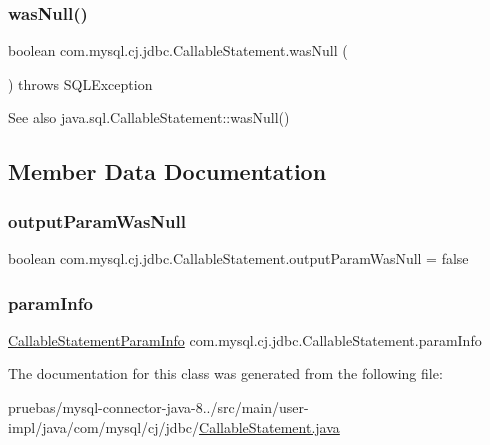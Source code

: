 \subsubsection{\texorpdfstring{was\+Null()}{wasNull()}}
{\footnotesize\ttfamily boolean com.\+mysql.\+cj.\+jdbc.\+Callable\+Statement.\+was\+Null (\begin{DoxyParamCaption}{ }\end{DoxyParamCaption}) throws S\+Q\+L\+Exception}

\begin{DoxySeeAlso}{See also}
java.\+sql.\+Callable\+Statement\+::was\+Null() 
\end{DoxySeeAlso}


\subsection{Member Data Documentation}
\mbox{\label{classcom_1_1mysql_1_1cj_1_1jdbc_1_1_callable_statement_a50b0a5e60e29ab7d67b07a27004293c4}} 
\subsubsection{\texorpdfstring{output\+Param\+Was\+Null}{outputParamWasNull}}
{\footnotesize\ttfamily boolean com.\+mysql.\+cj.\+jdbc.\+Callable\+Statement.\+output\+Param\+Was\+Null = false\hspace{0.3cm}{\ttfamily [protected]}}

\mbox{\label{classcom_1_1mysql_1_1cj_1_1jdbc_1_1_callable_statement_a9b918f6fd2f0ff28fc6b3c8560d9a59b}} 
\subsubsection{\texorpdfstring{param\+Info}{paramInfo}}
{\footnotesize\ttfamily \mbox{\hyperlink{classcom_1_1mysql_1_1cj_1_1jdbc_1_1_callable_statement_1_1_callable_statement_param_info}{Callable\+Statement\+Param\+Info}} com.\+mysql.\+cj.\+jdbc.\+Callable\+Statement.\+param\+Info\hspace{0.3cm}{\ttfamily [protected]}}



The documentation for this class was generated from the following file\+:\begin{DoxyCompactItemize}
\item 
pruebas/mysql-\/connector-\/java-\/8../src/main/user-\/impl/java/com/mysql/cj/jdbc/\mbox{\hyperlink{_callable_statement_8java}{Callable\+Statement.\+java}}\end{DoxyCompactItemize}
